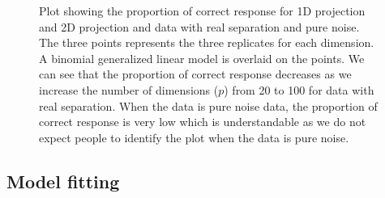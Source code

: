 \documentclass[12]{article}
\begin{document}
\begin{figure}[hbtp]
   \centering
      \caption{Plot showing the proportion of correct response for 1D projection and 2D projection and data with real separation and pure noise. The three points represents the three replicates for each dimension. A binomial generalized linear model is overlaid on the points. We can see that the proportion of correct response decreases as we increase the number of dimensions ($p$) from 20 to 100 for data with real separation. When the data is pure noise data, the proportion of correct response is very low which is understandable as we do not expect people to identify the plot when the data is pure noise.  }
       \label{suc-rate-glm}
\end{figure}

\subsection{Model fitting}
\end{document}

